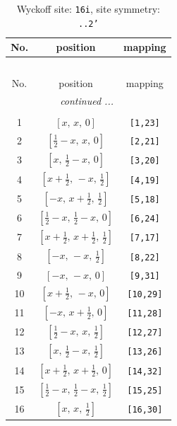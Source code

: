 \documentclass[fleqn,8pt]{jsarticle}
\begin{document}
\begin{longtable}{ccc}
\caption{Wyckoff site: {\tt 16i}, site symmetry: {\tt ..2'}}
 \\
 \hline \hline
No. & position & mapping \\ \hline \endfirsthead

\multicolumn{2}{l}{\tablename\ \thetable{}} \\
 \hline \hline
No. & position & mapping \\ \hline \endhead

 \hline \hline
\multicolumn{2}{r}{\footnotesize\it continued ...} \\ \endfoot

 \hline \hline
\multicolumn{2}{r}{} \\ \endlastfoot

1 & $\left[ x,\, x,\, 0 \right]$ & {\tt [1,23]} \\ \hline
2 & $\left[ \frac{1}{2} - x,\, x,\, 0 \right]$ & {\tt [2,21]} \\ \hline
3 & $\left[ x,\, \frac{1}{2} - x,\, 0 \right]$ & {\tt [3,20]} \\ \hline
4 & $\left[ x + \frac{1}{2},\, - x,\, \frac{1}{2} \right]$ & {\tt [4,19]} \\ \hline
5 & $\left[ - x,\, x + \frac{1}{2},\, \frac{1}{2} \right]$ & {\tt [5,18]} \\ \hline
6 & $\left[ \frac{1}{2} - x,\, \frac{1}{2} - x,\, 0 \right]$ & {\tt [6,24]} \\ \hline
7 & $\left[ x + \frac{1}{2},\, x + \frac{1}{2},\, \frac{1}{2} \right]$ & {\tt [7,17]} \\ \hline
8 & $\left[ - x,\, - x,\, \frac{1}{2} \right]$ & {\tt [8,22]} \\ \hline
9 & $\left[ - x,\, - x,\, 0 \right]$ & {\tt [9,31]} \\ \hline
10 & $\left[ x + \frac{1}{2},\, - x,\, 0 \right]$ & {\tt [10,29]} \\ \hline
11 & $\left[ - x,\, x + \frac{1}{2},\, 0 \right]$ & {\tt [11,28]} \\ \hline
12 & $\left[ \frac{1}{2} - x,\, x,\, \frac{1}{2} \right]$ & {\tt [12,27]} \\ \hline
13 & $\left[ x,\, \frac{1}{2} - x,\, \frac{1}{2} \right]$ & {\tt [13,26]} \\ \hline
14 & $\left[ x + \frac{1}{2},\, x + \frac{1}{2},\, 0 \right]$ & {\tt [14,32]} \\ \hline
15 & $\left[ \frac{1}{2} - x,\, \frac{1}{2} - x,\, \frac{1}{2} \right]$ & {\tt [15,25]} \\ \hline
16 & $\left[ x,\, x,\, \frac{1}{2} \right]$ & {\tt [16,30]} \\
\end{longtable}
\end{document}
